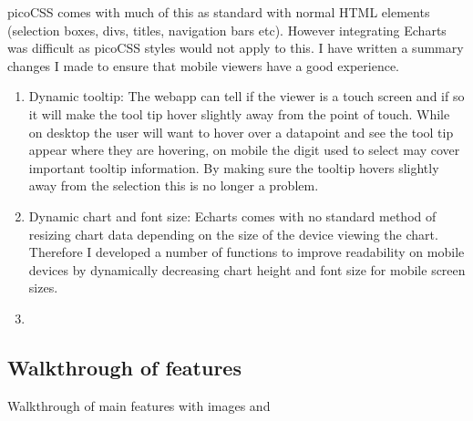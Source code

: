 picoCSS comes with much of this as standard with normal HTML elements (selection
boxes, divs, titles, navigation bars etc). However integrating Echarts was
difficult as picoCSS styles would not apply to this. I have written a summary
changes I made to ensure that mobile viewers have a good experience.

\begin{enumerate}
    \item Dynamic tooltip: The webapp can tell if the viewer is a touch screen
          and if so it will make the tool tip hover slightly away from the point
          of touch. While on desktop the user will want to hover over a
          datapoint and see the tool tip appear where they are hovering, on
          mobile the digit used to select may cover important tooltip
          information. By making sure the tooltip hovers slightly away from the
          selection this is no longer a problem.
    \item Dynamic chart and font size: Echarts comes with no standard method of
          resizing chart data depending on the size of the device viewing the
          chart. Therefore I developed a number of functions to improve
          readability on mobile devices by dynamically decreasing chart height
          and font size for mobile screen sizes.
    \item
\end{enumerate}

\subsection{ Walkthrough of features}

Walkthrough of main features with images and 



